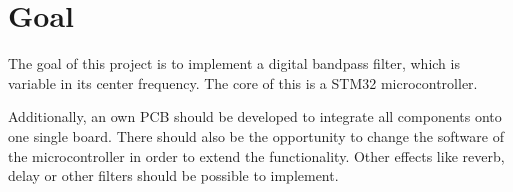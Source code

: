 \section{Goal}

The goal of this project is to implement a digital bandpass filter, which is variable in its center frequency.
The core of this is a STM32 microcontroller.

Additionally, an own \ac{PCB} should be developed to integrate all components onto one single board.
There should also be the opportunity to change the software of the microcontroller in order to extend
the functionality. Other effects like reverb, delay or other filters should be possible to implement.

